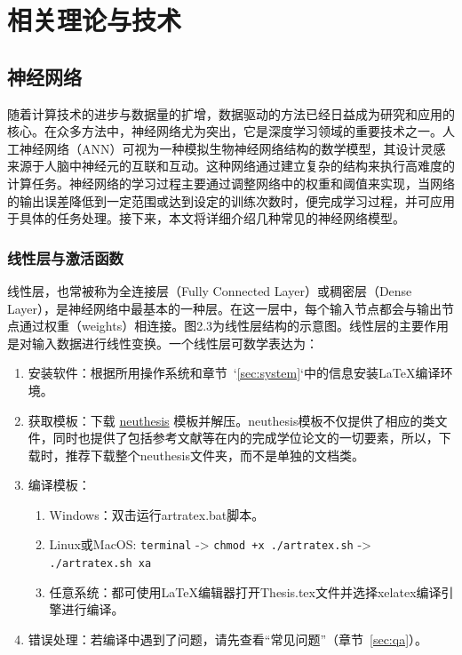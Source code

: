 \chapter{相关理论与技术}\label{chap:guide}


\section{神经网络}
随着计算技术的进步与数据量的扩增，数据驱动的方法已经日益成为研究和应用的核心。在众多方法中，神经网络尤为突出，它是深度学习领域的重要技术之一。人工神经网络（ANN）可视为一种模拟生物神经网络结构的数学模型，其设计灵感来源于人脑中神经元的互联和互动。这种网络通过建立复杂的结构来执行高难度的计算任务。神经网络的学习过程主要通过调整网络中的权重和阈值来实现，当网络的输出误差降低到一定范围或达到设定的训练次数时，便完成学习过程，并可应用于具体的任务处理。接下来，本文将详细介绍几种常见的神经网络模型。
\subsection{线性层与激活函数}
线性层，也常被称为全连接层（Fully Connected Layer）或稠密层（Dense Layer），是神经网络中最基本的一种层。在这一层中，每个输入节点都会与输出节点通过权重（weights）相连接。图2.3为线性层结构的示意图。线性层的主要作用是对输入数据进行线性变换。一个线性层可数学表达为：

\begin{enumerate}
    \item 安装软件：根据所用操作系统和章节~`\ref{sec:system}`中的信息安装LaTeX编译环境。
    \item 获取模板：下载 \href{https://github.com/mervin0502/neuthesis}{neuthesis} 模板并解压。neuthesis模板不仅提供了相应的类文件，同时也提供了包括参考文献等在内的完成学位论文的一切要素，所以，下载时，推荐下载整个neuthesis文件夹，而不是单独的文档类。
    \item 编译模板：
        \begin{enumerate}
            \item Windows：双击运行artratex.bat脚本。
            \item Linux或MacOS: {\scriptsize \verb|terminal| -> \verb|chmod +x ./artratex.sh| -> \verb|./artratex.sh xa|}
            \item 任意系统：都可使用LaTeX编辑器打开Thesis.tex文件并选择xelatex编译引擎进行编译。
        \end{enumerate}
    \item 错误处理：若编译中遇到了问题，请先查看“常见问题”（章节~\ref{sec:qa}）。
\end{enumerate}

